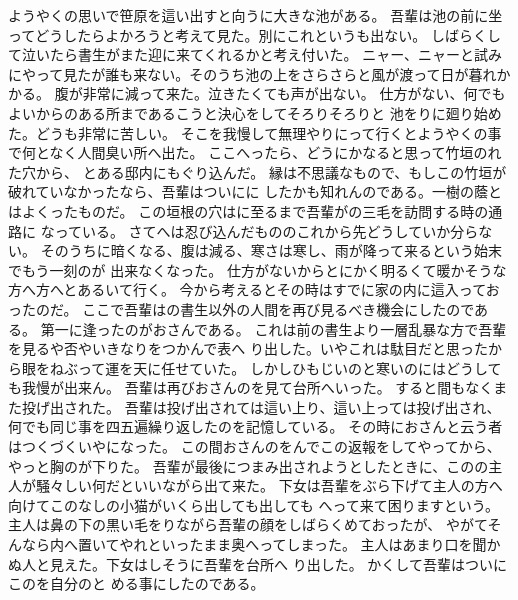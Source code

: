 \documentclass[lualatex,paper=b5,jafontsize=12pt]{jlreq}
\begin{document}
ようやくの思いで笹原を這い出すと向うに大きな池がある。
吾輩は池の前に坐ってどうしたらよかろうと考えて見た。別にこれというも出ない。
しばらくして泣いたら書生がまた迎に来てくれるかと考え付いた。
ニャー、ニャーと試みにやって見たが誰も来ない。そのうち池の上をさらさらと風が渡って日が暮れかかる。
腹が非常に減って来た。泣きたくても声が出ない。
仕方がない、何でもよいからのある所まであるこうと決心をしてそろりそろりと
池をりに廻り始めた。どうも非常に苦しい。
そこを我慢して無理やりにって行くとようやくの事で何となく人間臭い所へ出た。
ここへったら、どうにかなると思って竹垣のれた穴から、
とある邸内にもぐり込んだ。
縁は不思議なもので、もしこの竹垣が破れていなかったなら、吾輩はついにに
したかも知れんのである。一樹の蔭とはよくったものだ。
この垣根の穴はに至るまで吾輩がの三毛を訪問する時の通路に
なっている。
さてへは忍び込んだもののこれから先どうしていか分らない。
そのうちに暗くなる、腹は減る、寒さは寒し、雨が降って来るという始末でもう一刻のが
出来なくなった。
仕方がないからとにかく明るくて暖かそうな方へ方へとあるいて行く。
今から考えるとその時はすでに家の内に這入っておったのだ。
ここで吾輩はの書生以外の人間を再び見るべき機会にしたのである。
第一に逢ったのがおさんである。
これは前の書生より一層乱暴な方で吾輩を見るや否やいきなりをつかんで表へ
り出した。いやこれは駄目だと思ったから眼をねぶって運を天に任せていた。
しかしひもじいのと寒いのにはどうしても我慢が出来ん。
吾輩は再びおさんのを見て台所へいった。
すると間もなくまた投げ出された。
吾輩は投げ出されては這い上り、這い上っては投げ出され、何でも同じ事を四五遍繰り返したのを記憶している。
その時におさんと云う者はつくづくいやになった。
この間おさんのをんでこの返報をしてやってから、
やっと胸のが下りた。
吾輩が最後につまみ出されようとしたときに、このの主人が騒々しい何だといいながら出て来た。
下女は吾輩をぶら下げて主人の方へ向けてこのなしの小猫がいくら出しても出しても
へって来て困りますという。
主人は鼻の下の黒い毛をりながら吾輩の顔をしばらくめておったが、
やがてそんなら内へ置いてやれといったまま奥へってしまった。
主人はあまり口を聞かぬ人と見えた。下女はしそうに吾輩を台所へ
り出した。
かくして吾輩はついにこのを自分のと
める事にしたのである。
\end{document}
